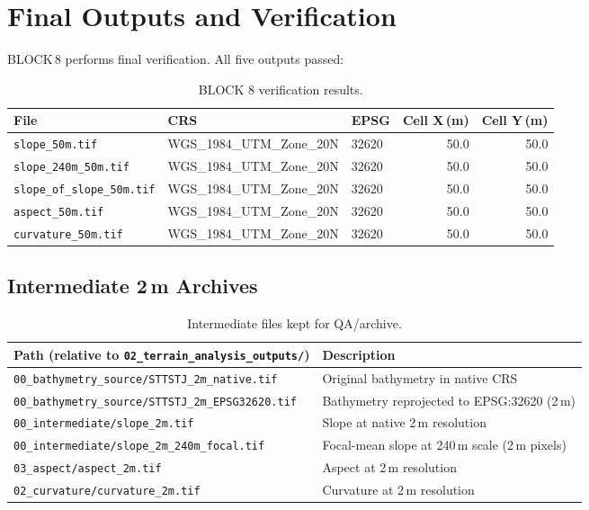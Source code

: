 \documentclass[11pt, a4paper]{article}
\newcommand{\cmark}{\textcolor{OliveGreen}{\ding{51}}}
\begin{document}
\section{Final Outputs and Verification}

BLOCK\,8 performs final verification.  All five outputs passed:

\begin{table}[h]
\centering
\caption{BLOCK 8 verification results.}
\begin{tabular}{lllrr}
\toprule
\textbf{File} & \textbf{CRS} & \textbf{EPSG} & \textbf{Cell X\,(m)} & \textbf{Cell Y\,(m)} \\
\midrule
\cmark{} \texttt{slope\_50m.tif}           & WGS\_1984\_UTM\_Zone\_20N & 32620 & 50.0 & 50.0 \\
\cmark{} \texttt{slope\_240m\_50m.tif}     & WGS\_1984\_UTM\_Zone\_20N & 32620 & 50.0 & 50.0 \\
\cmark{} \texttt{slope\_of\_slope\_50m.tif}& WGS\_1984\_UTM\_Zone\_20N & 32620 & 50.0 & 50.0 \\
\cmark{} \texttt{aspect\_50m.tif}          & WGS\_1984\_UTM\_Zone\_20N & 32620 & 50.0 & 50.0 \\
\cmark{} \texttt{curvature\_50m.tif}       & WGS\_1984\_UTM\_Zone\_20N & 32620 & 50.0 & 50.0 \\
\bottomrule
\end{tabular}
\end{table}

\subsection{Intermediate 2\,m Archives}

\begin{table}[h]
\centering
\caption{Intermediate files kept for QA/archive.}
\begin{tabularx}{\linewidth}{L{7cm}X}
\toprule
\textbf{Path (relative to \texttt{02\_terrain\_analysis\_outputs/})} & \textbf{Description} \\
\midrule
\texttt{00\_bathymetry\_source/STTSTJ\_2m\_native.tif}  & Original bathymetry in native CRS \\
\texttt{00\_bathymetry\_source/STTSTJ\_2m\_EPSG32620.tif} & Bathymetry reprojected to EPSG:32620 (2\,m) \\
\texttt{00\_intermediate/slope\_2m.tif}                 & Slope at native 2\,m resolution \\
\texttt{00\_intermediate/slope\_2m\_240m\_focal.tif}    & Focal-mean slope at 240\,m scale (2\,m pixels) \\
\texttt{03\_aspect/aspect\_2m.tif}                      & Aspect at 2\,m resolution \\
\texttt{02\_curvature/curvature\_2m.tif}                & Curvature at 2\,m resolution \\
\bottomrule
\end{tabularx}
\end{table}
\end{document}
